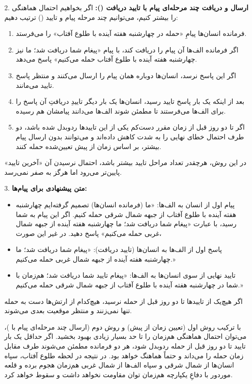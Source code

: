 2. \textbf{ارسال و دریافت چند مرحله‌ای پیام با تایید دریافت ():}  
   اگر بخواهیم احتمال هماهنگی را بیشتر کنیم، می‌توانیم چند مرحله پیام و تایید () ترتیب دهیم:
   \begin{enumerate}
       \item فرمانده انسان‌ها پیامِ «حمله در چهارشنبه هفته آینده با طلوع آفتاب» را می‌فرستد.
       \item اگر فرمانده الف‌ها آن پیام را دریافت کند، با پیام «پیغام شما دریافت شد؛ ما نیز چهارشنبه هفته آینده با طلوع آفتاب حمله می‌کنیم» پاسخ می‌دهد.
       \item اگر این پاسخ نرسد، انسان‌ها دوباره همان پیام را ارسال می‌کنند و منتظر پاسخ تایید می‌مانند.  
       \item بعد از اینکه یک بار پاسخ تایید رسید، انسان‌ها یک بار دیگر تاییدِ دریافتِ آن پاسخ را برای الف‌ها می‌فرستند تا مطمئن شوند الف‌ها می‌دانند پیامشان هم رسیده.  
       \item اگر تا دو روز قبل از زمان مقرر دست‌کم یکی از این تاییدها ردوبدل شده باشد، دو طرف احتمال خطای نهایی را به شدت کاهش داده‌اند و می‌توانند بدون ارسال پیام بیشتر، بر اساس زمان از پیش تعیین‌شده حمله کنند.
   \end{enumerate}
   در این روش، هرچقدر تعداد مراحل تایید بیشتر باشد، احتمال نرسیدن آن «آخرین تایید» پایین‌تر می‌رود اما هرگز به صفر نمی‌رسد.

3. \textbf{متن پیشنهادی برای پیام‌ها:}  
   \begin{itemize}
   \item {پیام اول از انسان به الف‌ها:}  
        «ما (فرمانده انسان‌ها) تصمیم گرفته‌ایم چهارشنبه هفته آینده با طلوع آفتاب از جبهه شمال شرقی حمله کنیم. اگر این پیام به شما رسید، با عبارت «پیغام شما دریافت شد؛ ما چهارشنبه هفته آینده از جبهه شمال غربی حمله می‌کنیم» پاسخ دهید. در غیر این صورت، 

   \item {پاسخ اول از الف‌ها به انسان‌ها (تایید دریافت):}  
        «پیغام شما دریافت شد؛ ما چهارشنبه هفته آینده از جبهه شمال غربی حمله می‌کنیم.»

   \item {تایید نهایی از سوی انسان‌ها به الف‌ها:}  
        «پیغام تایید شما دریافت شد؛ هم‌زمان با شما در چهارشنبه هفته آینده با طلوع آفتاب از جبهه شمال شرقی حمله می‌کنیم.»
   \end{itemize}
   اگر هیچ‌یک از تاییدها تا دو روز قبل از حمله نرسید، هیچ‌کدام از ارتش‌ها دست به حمله تنها نمی‌زنند و منتظر موقعیت بعدی می‌شوند.

\bigskip

با ترکیب روش اول (تعیین زمان از پیش) و روش دوم (ارسال چند مرحله‌ای پیام با )، می‌توان احتمال هماهنگی هم‌زمان را تا حد بسیار زیادی بهبود بخشید. اگر حداقل یک بار تایید تا دو روز قبل از حمله ردوبدل شود، هر دو فرمانده مطمئن می‌شوند طرف مقابل زمان حمله را می‌داند و حتماً هماهنگ خواهد بود. در نتیجه در لحظه طلوع آفتاب، سپاه انسان‌ها از شمال شرقی و سپاه الف‌ها از شمال غربی هم‌زمان هجوم برده و قلعه موردور با دفاعِ یکپارچه هم‌زمان توان مقاومت نخواهد داشت و سقوط خواهد کرد.



